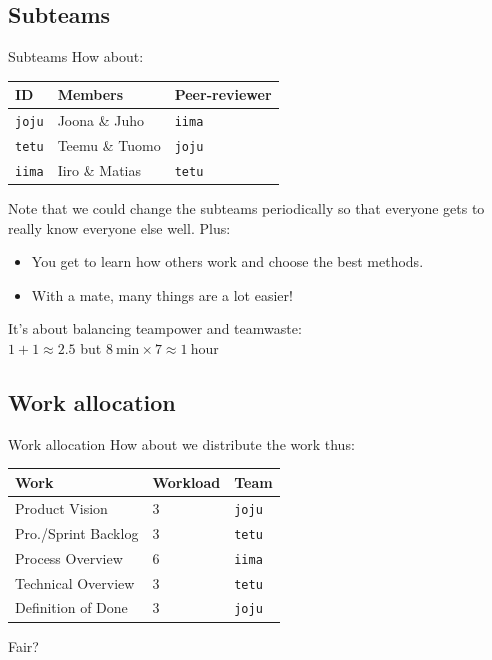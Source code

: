 \documentclass{beamer}
\begin{document}
\subsection{Subteams}
\begin{frame}{Subteams}
  How about:
  \begin{table}
  \begin{tabular}{lll}
  ID & Members & Peer-reviewer \\ \hline
  \texttt{joju} & Joona \& Juho & \texttt{iima} \\
  \texttt{tetu} & Teemu \& Tuomo & \texttt{joju} \\
  \texttt{iima} & Iiro \& Matias & \texttt{tetu} \\
  \end{tabular}
  \end{table}
  \pause Note that we could change the subteams periodically so that everyone
  gets to really know everyone else well. Plus:
  \begin{itemize}
  \pause \item You get to learn how others work and choose the best methods.
  \pause \item With a mate, many things are a lot easier!
  \end{itemize}
  \pause It's about balancing team\alert{power} and team\alert{waste}: \\
  $1 + 1 \approx 2.5$ but $8 ~\textrm{min} \times 7 \approx 1 ~\textrm{hour}$
\end{frame}
\subsection{Work allocation}
\begin{frame}{Work allocation}
  How about we distribute the work thus:
  \begin{table}
  \begin{tabular}{lll}
  Work & Workload & Team \\ \hline
  \pause Product Vision & 3 & \texttt{joju} \\
  \pause Pro./Sprint Backlog & 3 & \texttt{tetu} \\
  \pause Process Overview & 6 & \texttt{iima} \\
  \pause Technical Overview & 3 & \texttt{tetu} \\
  \pause Definition of Done & 3 & \texttt{joju} \\
  \end{tabular}
  \end{table}
  \pause Fair?
\end{frame}
\end{document}
